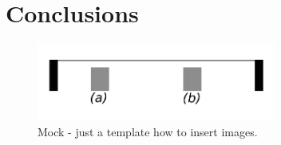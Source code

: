\documentclass{llncs}
\begin{document}
\section{Conclusions}

\begin{figure}
\centering
\includegraphics[width=0.7\textwidth]{images/setup}
\caption{Mock - just a template how to insert images.}
\label{fig:mock}
\end{figure}

\begin{figure}
\centering
\begin{minipage}{.47\linewidth}
\centering
{}
\end{minipage}
\begin{minipage}{.47\linewidth}
\centering
{}

\end{minipage}
\end{figure}
\end{document}
